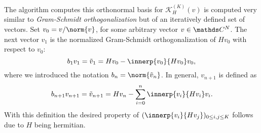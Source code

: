 The algorithm computes this orthonormal basis for \(\mathcal{K}^{(K)}_H(v)\) is computed very similar to \emph{Gram-Schmidt orthogonalization} but of an iteratively defined set of vectors. 
Set \(v_0 = v / \norm{v}\), for some arbitrary vector \(v\in\C^N\). 
The next vector \(v_1\) is the normalized Gram-Schmidt orthogonalization of \(H v_0\) with respect to \(v_0\):
\begin{equation}
    b_1 v_1 = \tilde v_1 = H v_0 - \innerp{v_0}{H v_0} v_0
    ,
\end{equation}
where we introduced the notation \(b_n = \norm{\tilde v_n}\).
In general, \(v_{n+1}\) is defined as 
\begin{equation}
    b_{n+1} v_{n+1} = \tilde v_{n+1} = H v_n - \sum_{i=0}^n \innerp{v_i}{H v_i} v_i
    .
\end{equation}
With this definition the desired property of \((\innerp{v_i}{H v_j})_{0 \leq i,j \leq K}\) follows due to \(H\) being hermitian.

